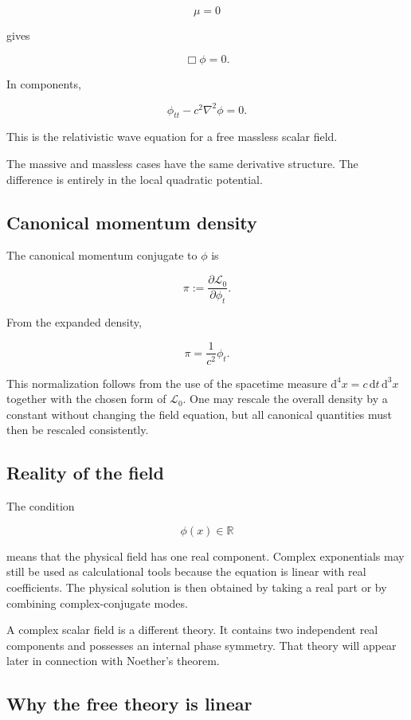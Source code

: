 \[
\mu=0
\]

gives

\[
\boxed{
\Box\phi=0
}.
\]

In components,

\[
\phi_{tt}-c^{2}\nabla^{2}\phi=0.
\]

This is the relativistic wave equation for a free massless scalar field.

The massive and massless cases have the same derivative structure. The difference is entirely in the local quadratic potential.

\subsection{Canonical momentum density}

The canonical momentum conjugate to \(\phi\) is

\[
\pi
:=
\frac{\partial\mathcal{L}_{0}}
{\partial\phi_{t}}.
\]

From the expanded density,

\[
\boxed{
\pi
=
\frac{1}{c^{2}}\phi_{t}
}.
\]

This normalization follows from the use of the spacetime measure \(\mathrm{d}^{4}x=c\,\mathrm{d}t\,\mathrm{d}^{3}x\) together with the chosen form of \(\mathcal{L}_{0}\). One may rescale the overall density by a constant without changing the field equation, but all canonical quantities must then be rescaled consistently.

\subsection{Reality of the field}

The condition

\[
\phi(x)\in\mathbb{R}
\]

means that the physical field has one real component. Complex exponentials may still be used as calculational tools because the equation is linear with real coefficients. The physical solution is then obtained by taking a real part or by combining complex-conjugate modes.

A complex scalar field is a different theory. It contains two independent real components and possesses an internal phase symmetry. That theory will appear later in connection with Noether's theorem.

\subsection{Why the free theory is linear}

